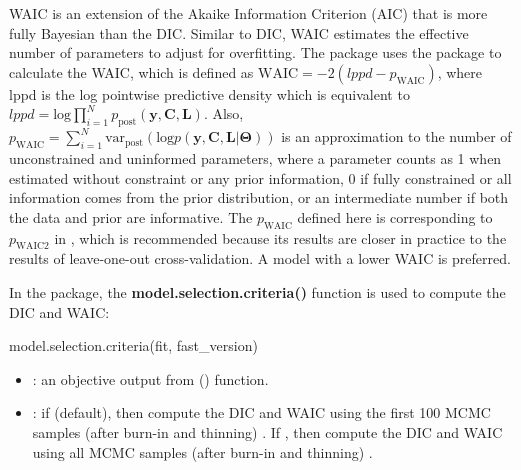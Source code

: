 WAIC is an extension of the Akaike Information Criterion (AIC) that is more fully Bayesian than the DIC. Similar to DIC, WAIC estimates the effective number of parameters to adjust for overfitting. The  package uses the  package \citep{Hall2022} to calculate the WAIC, which is defined as $ \text{WAIC} = -2(lppd - p_{\text{WAIC}}) $, where lppd is the log pointwise predictive density which is equivalent to $lppd=\text{log}\prod_{i=1}^Np_{\text{post}}(\boldsymbol{y},\boldsymbol{C},\boldsymbol{L})$. Also, $p_{\text{WAIC}} = \sum_{i=1}^N \text{var}_{\text{post}} (\text{log}p(\boldsymbol{y},\boldsymbol{C},\boldsymbol{L}|\boldsymbol{\Theta})) $ is an approximation to the number of unconstrained and uninformed parameters, where a parameter counts as 1 when estimated without constraint or any prior information, 0 if fully constrained or all information comes from the prior distribution, or an intermediate number if both the data and prior are informative. The $p_{\text{WAIC}}$ defined here is corresponding to $p_{\text{WAIC2}}$ in \citet{Gelman2014a}, which is recommended because its results are closer in practice to the results of leave-one-out cross-validation. A model with a lower WAIC is preferred.

In the  package,  the \textbf{model.selection.criteria()} function is used to compute the DIC and WAIC: 

\begin{example}
model.selection.criteria(fit, fast_version)
\end{example}
\begin{itemize}
	\item {}: an objective output from () function.  
	\item {}: if   (default), then compute the DIC and WAIC using the first 100 MCMC samples (after burn-in and thinning) . If  , then compute the DIC and WAIC using all MCMC samples (after burn-in and thinning) . 
\end{itemize}
 
